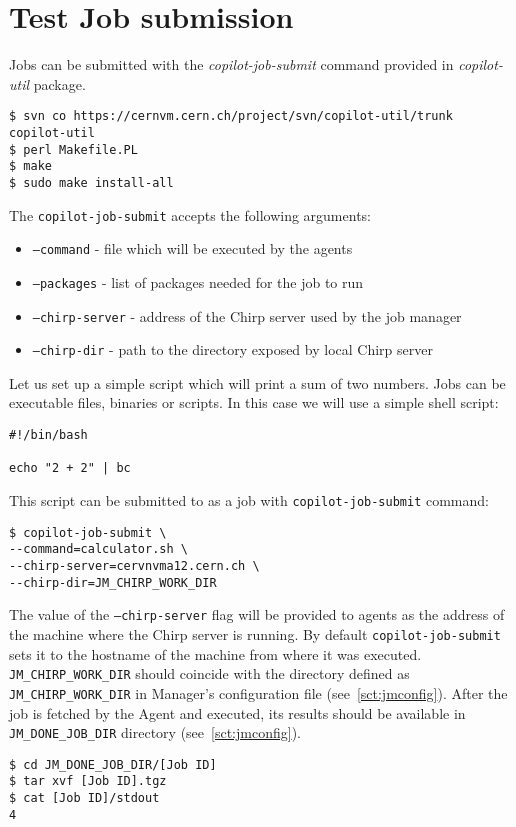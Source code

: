 \section{Test Job submission}

Jobs can be submitted with the \emph{copilot-job-submit} command provided in \emph{copilot-util} package.

\lstset{caption=Obtaining copilot-util package from SVN}
\begin{lstlisting}
$ svn co https://cernvm.cern.ch/project/svn/copilot-util/trunk copilot-util
$ perl Makefile.PL
$ make
$ sudo make install-all
\end{lstlisting}

The \texttt{copilot-job-submit} accepts the following arguments:
\begin{itemize}
  \item \texttt{--command} - file which will be executed by the agents
  \item \texttt{--packages} - list of packages needed for the job to run
  \item \texttt{--chirp-server} - address of the Chirp server used by the job manager
  \item \texttt{--chirp-dir} - path to the directory exposed by local Chirp server
\end{itemize}

Let us set up a simple script which will print a sum of two numbers. Jobs can be executable files, binaries or scripts. In this case we will use a simple shell script:

\begin{lstlisting}
#!/bin/bash

echo "2 + 2" | bc
\end{lstlisting}

This script can be submitted to \copilot as a job with \texttt{copilot-job-submit} command:
\lstset{caption=Submitting a job}
\begin{lstlisting}
$ copilot-job-submit \
--command=calculator.sh \
--chirp-server=cervnvma12.cern.ch \
--chirp-dir=JM_CHIRP_WORK_DIR
\end{lstlisting}

The value of the \texttt{--chirp-server} flag will be provided to agents as the address of the machine where the Chirp server is running. By default \texttt{copilot-job-submit} sets it to the hostname of the machine from where it was executed.
\texttt{JM\_CHIRP\_WORK\_DIR} should coincide with the directory defined as \texttt{JM\_CHIRP\_WORK\_DIR} in Manager's configuration file (see~\ref{sct:jmconfig}). After the job is fetched by the \copilot Agent and executed, its results should be available in \texttt{JM\_DONE\_JOB\_DIR} directory (see~\ref{sct:jmconfig}).


\lstset{caption=Inspecting job results}
\begin{lstlisting}
$ cd JM_DONE_JOB_DIR/[Job ID]
$ tar xvf [Job ID].tgz
$ cat [Job ID]/stdout
4
\end{lstlisting}

